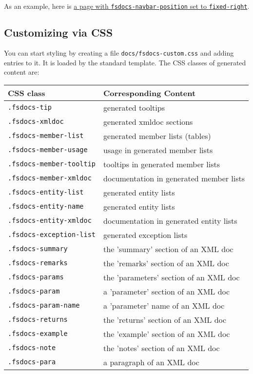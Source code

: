 \documentclass{article}
\begin{document}
As an example, here is \href{templates/leftside/styling.html}{a page with \texttt{fsdocs-navbar-position} set to \texttt{fixed-right}}.
\subsection*{Customizing via CSS}



You can start styling by creating a file \texttt{docs/fsdocs-custom.css} and adding entries to it.  It is loaded by
the standard template.  The CSS classes of generated content are:
\begin{tabular}{|l|l|}\hline
\textbf{CSS class} & \textbf{Corresponding Content}\\ \hline\hline
\texttt{.fsdocs-tip} & generated tooltips\\ \hline
\texttt{.fsdocs-xmldoc} & generated xmldoc sections\\ \hline
\texttt{.fsdocs-member-list} & generated member lists (tables)\\ \hline
\texttt{.fsdocs-member-usage} & usage in generated member lists\\ \hline
\texttt{.fsdocs-member-tooltip} & tooltips in generated member lists\\ \hline
\texttt{.fsdocs-member-xmldoc} & documentation in generated member lists\\ \hline
\texttt{.fsdocs-entity-list} & generated entity lists\\ \hline
\texttt{.fsdocs-entity-name} & generated entity lists\\ \hline
\texttt{.fsdocs-entity-xmldoc} & documentation in generated entity lists\\ \hline
\texttt{.fsdocs-exception-list} & generated exception lists\\ \hline
\texttt{.fsdocs-summary} & the 'summary' section of an XML doc\\ \hline
\texttt{.fsdocs-remarks} & the 'remarks' section of an XML doc\\ \hline
\texttt{.fsdocs-params} & the 'parameters' section of an XML doc\\ \hline
\texttt{.fsdocs-param} & a 'parameter' section of an XML doc\\ \hline
\texttt{.fsdocs-param-name} & a 'parameter' name of an XML doc\\ \hline
\texttt{.fsdocs-returns} & the 'returns' section of an XML doc\\ \hline
\texttt{.fsdocs-example} & the 'example' section of an XML doc\\ \hline
\texttt{.fsdocs-note} & the 'notes' section of an XML doc\\ \hline
\texttt{.fsdocs-para} & a paragraph of an XML doc\\ \hline
\end{tabular}
\end{document}
